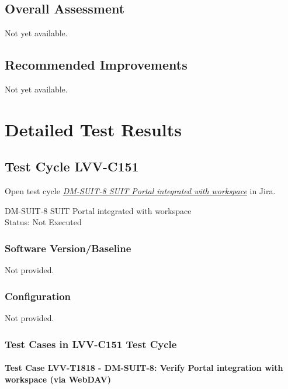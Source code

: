 \documentclass[DM,lsstdraft,STR,toc]{lsstdoc}
\begin{document}
\subsection{Overall Assessment}
\label{sect:overallassessment}

Not yet available.

\subsection{Recommended Improvements}
\label{sect:recommendations}

Not yet available.

\newpage
\section{Detailed Test Results}
\label{sect:detailedtestresults}

\subsection{Test Cycle LVV-C151 }

Open test cycle {\it \href{https://jira.lsstcorp.org/secure/Tests.jspa#/testrun/LVV-C151}{DM-SUIT-8 SUIT Portal integrated with workspace}} in Jira.

DM-SUIT-8 SUIT Portal integrated with workspace\\
Status: Not Executed



\subsubsection{Software Version/Baseline}
Not provided.

\subsubsection{Configuration}
Not provided.

\subsubsection{Test Cases in LVV-C151 Test Cycle}

\paragraph{Test Case LVV-T1818 - DM-SUIT-8: Verify Portal integration with workspace (via WebDAV) }\mbox{}\\
\end{document}
